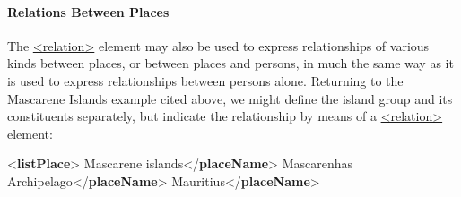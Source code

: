 \paragraph[{Relations Between Places}]{Relations Between Places}\label{place-rel}\par
The \hyperref[TEI.relation]{<relation>} element may also be used to express relationships of various kinds between places, or between places and persons, in much the same way as it is used to express relationships between persons alone. Returning to the Mascarene Islands example cited above, we might define the island group and its constituents separately, but indicate the relationship by means of a \hyperref[TEI.relation]{<relation>} element: \par\bgroup{}\exampleFont \begin{shaded}\noindent\mbox{}{<\textbf{listPlace}>}\mbox{}\newline 
{}\mbox{}\newline 
\hspace*{1em}Mascarene islands{</\textbf{placeName}>}\mbox{}\newline 
\hspace*{1em}Mascarenhas Archipelago{</\textbf{placeName}>}\mbox{}\newline 
{}\mbox{}\newline 
{}\mbox{}\newline 
\hspace*{1em}Mauritius{</\textbf{placeName}>}\mbox{}\newline 

\end{shaded}
